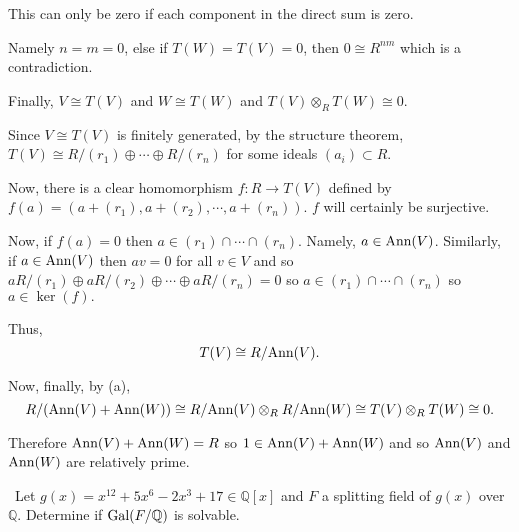 \documentclass[12pt]{Qual}
\begin{document}
\begin{solution}
\begin{enumerate}[label=(\alph*)]
    This can only be zero if each component in the direct sum is zero.

    Namely $n=m=0$, else if $T(W)=T(V)=0$, then $0\cong R^{nm}$ which is a contradiction.

    Finally, $V\cong T(V)$ and $W\cong T(W)$ and $T(V)\otimes_R T(W)\cong 0$.

    Since $V\cong T(V)$ is finitely generated, by the structure theorem, $T(V)\cong R/(r_1)\oplus\cdots\oplus R/(r_n)$ for some ideals $(a_i)\subset R.$

    Now, there is a clear homomorphism $f:R\to T(V)$ defined by $f(a)=(a+(r_1),a+(r_2),\cdots,a+(r_n)).$ $f$ will certainly be surjective.

    Now, if $f(a)=0$ then $a\in(r_1)\cap\cdots\cap(r_n)$. Namely, $a\in\text{Ann}(V)$. Similarly, if $a\in\text{Ann}(V)$ then $av=0$ for all $v\in V$ and so $aR/(r_1)\oplus aR/(r_2)\oplus\cdots\oplus aR/(r_n)=0$ so $a\in(r_1)\cap\cdots\cap(r_n)$ so $a\in\ker(f).$

    Thus, $$T(V)\cong R/\text{Ann}(V).$$

    Now, finally, by (a), $$R/(\text{Ann}(V)+\text{Ann}(W))\cong R/\text{Ann}(V)\otimes_RR/\text{Ann}(W)\cong T(V)\otimes_RT(W)\cong 0.$$

    Therefore $\text{Ann}(V)+\text{Ann}(W)=R$ so $1\in \text{Ann}(V)+\text{Ann}(W)$ and so $\text{Ann}(V)$ and $\text{Ann}(W)$ are relatively prime.
\end{enumerate}
\end{solution}
\newpage




\begin{problem} $\,$
Let $g(x)=x^{12}+5x^6-2x^3+17\in\mathbb{Q}[x]$ and $F$ a splitting field of $g(x)$ over $\mathbb{Q}$. Determine if $\text{Gal}(F/\mathbb{Q})$ is solvable.
\end{problem}
\end{document}
